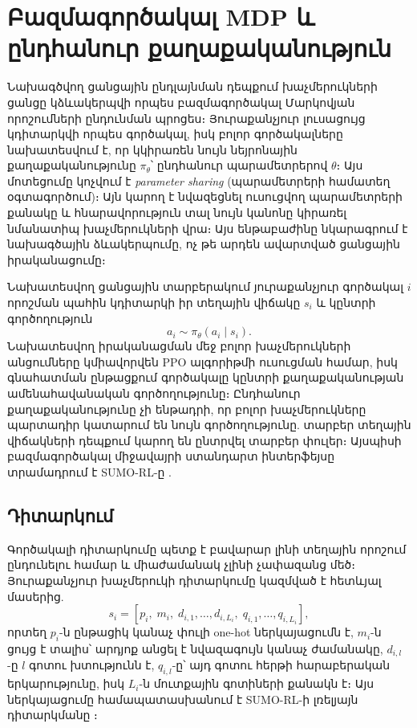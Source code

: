 \documentclass[12pt,a4paper]{extreport}
\begin{document}
\section{Բազմագործակալ MDP և ընդհանուր քաղաքականություն}

Նախագծվող ցանցային ընդլայնման դեպքում խաչմերուկների ցանցը կձևակերպվի որպես բազմագործակալ Մարկովյան որոշումների ընդունման պրոցես։ Յուրաքանչյուր լուսացույց կդիտարկվի որպես գործակալ, իսկ բոլոր գործակալները նախատեսվում է, որ կկիրառեն նույն նեյրոնային քաղաքականությունը $\pi_\theta$՝ ընդհանուր պարամետրերով $\theta$։ Այս մոտեցումը կոչվում է \textit{parameter sharing} (պարամետրերի համատեղ օգտագործում)։ Այն կարող է նվազեցնել ուսուցվող պարամետրերի քանակը և հնարավորություն տալ նույն կանոնը կիրառել նմանատիպ խաչմերուկների վրա։ Այս ենթաբաժինը նկարագրում է նախագծային ձևակերպումը, ոչ թե արդեն ավարտված ցանցային իրականացումը։

Նախատեսվող ցանցային տարբերակում յուրաքանչյուր գործակալ $i$ որոշման պահին կդիտարկի իր տեղային վիճակը $s_i$ և կընտրի գործողություն
\begin{equation}
    a_i \sim \pi_\theta(a_i\mid s_i).
\end{equation}
Նախատեսվող իրականացման մեջ բոլոր խաչմերուկների անցումները կմիավորվեն PPO ալգորիթմի ուսուցման համար, իսկ գնահատման ընթացքում գործակալը կընտրի քաղաքականության ամենահավանական գործողությունը։ Ընդհանուր քաղաքականությունը չի ենթադրի, որ բոլոր խաչմերուկները պարտադիր կատարում են նույն գործողությունը. տարբեր տեղային վիճակների դեպքում կարող են ընտրվել տարբեր փուլեր։ Այսպիսի բազմագործակալ միջավայրի ստանդարտ ինտերֆեյսը տրամադրում է SUMO-RL-ը \cite{sumorl}.

\subsection{Դիտարկում}

Գործակալի դիտարկումը պետք է բավարար լինի տեղային որոշում ընդունելու համար և միաժամանակ չլինի չափազանց մեծ։ Յուրաքանչյուր խաչմերուկի դիտարկումը կազմված է հետևյալ մասերից.
\begin{equation}
  s_i = [p_i,\; m_i,\; d_{i,1},\ldots,d_{i,L_i},\; q_{i,1},\ldots,q_{i,L_i}],
\end{equation}
որտեղ $p_i$-ն ընթացիկ կանաչ փուլի one-hot ներկայացումն է, $m_i$-ն ցույց է տալիս՝ արդյոք անցել է նվազագույն կանաչ ժամանակը, $d_{i,l}$-ը $l$ գոտու խտությունն է, $q_{i,l}$-ը՝ այդ գոտու հերթի հարաբերական երկարությունը, իսկ $L_i$-ն մուտքային գոտիների քանակն է։ Այս ներկայացումը համապատասխանում է SUMO-RL-ի լռելյայն դիտարկմանը \cite{sumorl}։
\end{document}
